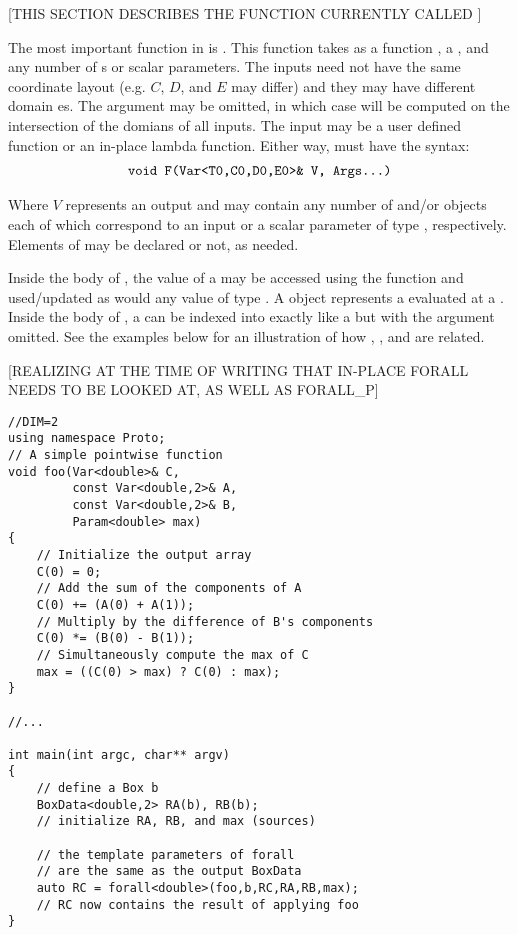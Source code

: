 \documentclass[12pt,a4paper]{article}
\begin{document}
[THIS SECTION DESCRIBES THE FUNCTION CURRENTLY CALLED ]

The most important function in  is . This function takes as a function , a , and any 
number of s or scalar parameters. The  inputs need not have the same coordinate layout (e.g. $C$, $D$, and $E$ may differ) and they may have different domain es. The  argument may be omitted, in which case  will be computed on the intersection of the domians of all  inputs. The input  may be a user defined function or an in-place lambda function. Either way,  must have the syntax:
\begin{align*}
\text{\texttt{void F(Var<T0,C0,D0,E0>\& V, Args...)}}
\end{align*}

Where $V$ represents an output  and  may contain any number of  and/or  objects each of which correspond to an input  or a scalar parameter of type , respectively. Elements of  may be declared  or not, as needed.

Inside the body of , the value of a  may be accessed using the  function and used/updated as would any value of type . A  object represents a  evaluated at a . Inside the body of , a  can be indexed into exactly like a  but with the  argument omitted. See the examples below for an illustration of how , ,  and  are related. 

[REALIZING AT THE TIME OF WRITING THAT IN-PLACE FORALL NEEDS TO BE LOOKED AT, AS WELL AS FORALL\_P]

\begin{lstlisting}[caption=Forall Usage with External Function, label=lst-forall-foo]
//DIM=2
using namespace Proto;
// A simple pointwise function
void foo(Var<double>& C,
		 const Var<double,2>& A,
	     const Var<double,2>& B,
		 Param<double> max)
{
	// Initialize the output array
	C(0) = 0;
	// Add the sum of the components of A
	C(0) += (A(0) + A(1));
	// Multiply by the difference of B's components
	C(0) *= (B(0) - B(1));
	// Simultaneously compute the max of C
	max = ((C(0) > max) ? C(0) : max);
}

//...

int main(int argc, char** argv)
{
	// define a Box b
	BoxData<double,2> RA(b), RB(b);
	// initialize RA, RB, and max (sources)
	
	// the template parameters of forall
	// are the same as the output BoxData
	auto RC = forall<double>(foo,b,RC,RA,RB,max);
	// RC now contains the result of applying foo
}
\end{lstlisting}
\end{document}
